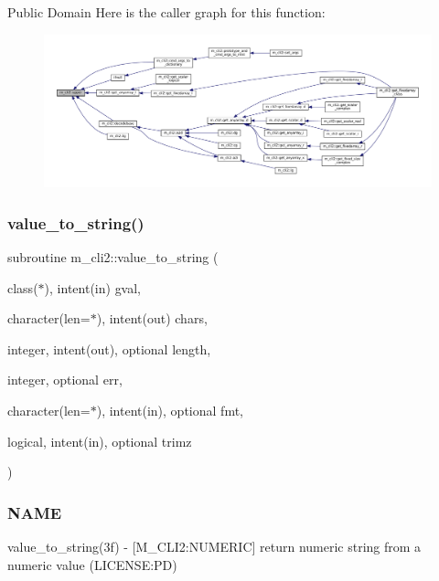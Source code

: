 Public Domain Here is the caller graph for this function\+:\nopagebreak
\begin{figure}[H]
\begin{center}
\leavevmode
\includegraphics[width=350pt]{namespacem__cli2_afa7a2419002024ff6d950c5d905ddd7a_icgraph}
\end{center}
\end{figure}
\mbox{\label{namespacem__cli2_a1bbcefd886dabb0286e2cb14ab54034f}} 
\subsubsection{\texorpdfstring{value\+\_\+to\+\_\+string()}{value\_to\_string()}}
{\footnotesize\ttfamily subroutine m\+\_\+cli2\+::value\+\_\+to\+\_\+string (\begin{DoxyParamCaption}\item[{class($\ast$), intent(in)}]{gval,  }\item[{character(len=$\ast$), intent(out)}]{chars,  }\item[{integer, intent(out), optional}]{length,  }\item[{integer, optional}]{err,  }\item[{character(len=$\ast$), intent(in), optional}]{fmt,  }\item[{logical, intent(in), optional}]{trimz }\end{DoxyParamCaption})\hspace{0.3cm}{\ttfamily [private]}}



\subsubsection*{N\+A\+ME}

value\+\_\+to\+\_\+string(3f) -\/ \mbox{[}M\+\_\+\+C\+L\+I2\+:N\+U\+M\+E\+R\+IC\mbox{]} return numeric string from a numeric value (L\+I\+C\+E\+N\+SE\+:PD) 

